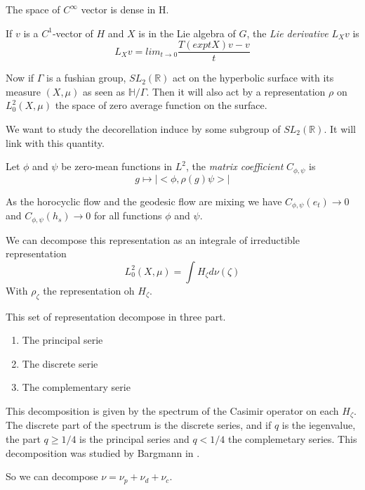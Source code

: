 \begin{rmq}
The space of $C^{\infty}$ vector is dense in H.
\end{rmq}

\begin{dfnt}
If $v$ is a $C^1$-vector of $H$ and $X$ is in the Lie algebra of $G$, the \emph{Lie derivative} $L_X v$ is \[
L_X v =lim_{t \to 0} \frac{T(exp tX)v-v}{t}
\]
\end{dfnt}

Now if $\Gamma$ is a fushian group, $SL_2(\mathbb{R})$ act on the hyperbolic surface with its measure $(X,\mu)$ as seen as $\mathbb{H}/ \Gamma$.
Then it will also act by a representation $\rho$ on $L^2_0(X,\mu)$ the space of zero average function on the surface.

We want to study the decorellation induce by some subgroup of $SL_2(\mathbb{R})$. It will link with this quantity.

\begin{dfnt}
Let $\phi$ and $\psi$ be zero-mean functions in $L^2$, the \emph{matrix coefficient} $C_{\phi,\psi}$ is\[
g \mapsto |<\phi, \rho(g) \psi>|
\]
\end{dfnt}

\begin{rmq}
As the horocyclic flow and the geodesic flow are mixing we have $C_{\phi,\psi}(e_t) \to 0$ and $C_{\phi,\psi}(h_s) \to 0$ for all functions $\phi$ and $\psi$.
\end{rmq}

We can decompose this representation as an integrale of irreductible representation \[
L^2_0(X,\mu)=\int H_\zeta d \nu(\zeta)
\]
With $\rho_{\zeta}$ the representation oh $H_{\zeta}$.

This set of representation decompose in three part. \begin{enumerate}
\item The principal serie
\item The discrete serie
\item The complementary serie
\end{enumerate}

This decomposition is given by the spectrum of the Casimir operator on each $H_\zeta$.
The discrete part of the spectrum is the discrete series, and if $q$ is the iegenvalue, the part $q \geq 1/4$ is the principal series and $q < 1/4$ the complemetary series. This decomposition was studied by Bargmann in \cite{10.2307/1969129}.

So we can decompose $\nu=\nu_p + \nu_d + \nu_c$.


